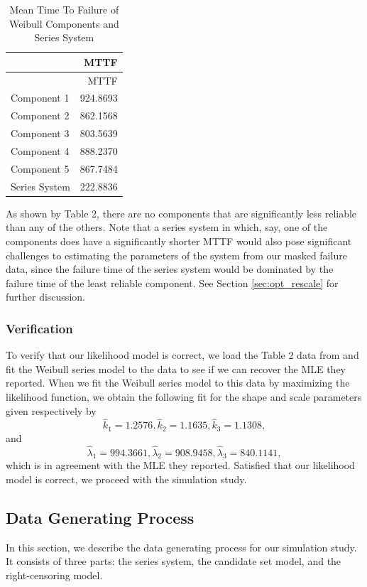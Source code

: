 \documentclass[
]{article}
\begin{document}
\begin{longtable}[]{@{}lr@{}}
\caption{Mean Time To Failure of Weibull Components and Series
System}\tabularnewline
\toprule
& MTTF\tabularnewline
\midrule
\endfirsthead
\toprule
& MTTF\tabularnewline
\midrule
\endhead
Component 1 & 924.8693\tabularnewline
Component 2 & 862.1568\tabularnewline
Component 3 & 803.5639\tabularnewline
Component 4 & 888.2370\tabularnewline
Component 5 & 867.7484\tabularnewline
Series System & 222.8836\tabularnewline
\bottomrule
\end{longtable}

As shown by Table 2, there are no components that are significantly less
reliable than any of the others. Note that a series system in which,
say, one of the components does have a significantly shorter MTTF would
also pose significant challenges to estimating the parameters of the
system from our masked failure data, since the failure time of the
series system would be dominated by the failure time of the least
reliable component. See Section \ref{sec:opt_rescale} for further
discussion.

\hypertarget{verification}{%
\subsubsection*{Verification}\label{verification}}

To verify that our likelihood model is correct, we load the Table 2 data
from \citep{Huairu-2013} and fit the Weibull series model to the data to
see if we can recover the MLE they reported. When we fit the Weibull
series model to this data by maximizing the likelihood function, we
obtain the following fit for the shape and scale parameters given
respectively by \[
    \hat{k}_1 = 1.2576,
    \hat{k}_2 = 1.1635,
    \hat{k}_3 = 1.1308,
\] and \[
    \hat{\lambda}_1 = 994.3661,
    \hat{\lambda}_2 = 908.9458,
    \hat{\lambda}_3 = 840.1141,
\] which is in agreement with the MLE they reported. Satisfied that our
likelihood model is correct, we proceed with the simulation study.

\hypertarget{data-generating-process}{%
\subsection{Data Generating Process}\label{data-generating-process}}

In this section, we describe the data generating process for our
simulation study. It consists of three parts: the series system, the
candidate set model, and the right-censoring model.
\end{document}
